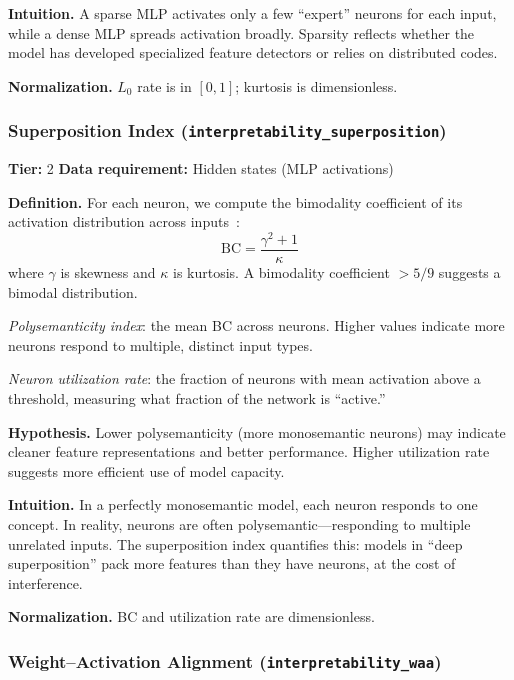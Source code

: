 \documentclass{article}
\begin{document}
\textbf{Intuition.}
A sparse MLP activates only a few ``expert'' neurons for each input, while a dense MLP spreads activation broadly. Sparsity reflects whether the model has developed specialized feature detectors or relies on distributed codes.

\textbf{Normalization.} $L_0$ rate is in $[0, 1]$; kurtosis is dimensionless.

\subsubsection{Superposition Index (\texttt{interpretability\_superposition})}
\label{app:superposition}

\textbf{Tier:} 2 \quad \textbf{Data requirement:} Hidden states (MLP activations)

\textbf{Definition.}
For each neuron, we compute the bimodality coefficient of its activation distribution across inputs~\citep{templeton2024scaling}:
\begin{equation}
  \text{BC} = \frac{\gamma^2 + 1}{\kappa}
\end{equation}
where $\gamma$ is skewness and $\kappa$ is kurtosis. A bimodality coefficient $> 5/9$ suggests a bimodal distribution.

\emph{Polysemanticity index}: the mean BC across neurons. Higher values indicate more neurons respond to multiple, distinct input types.

\emph{Neuron utilization rate}: the fraction of neurons with mean activation above a threshold, measuring what fraction of the network is ``active.''

\textbf{Hypothesis.}
Lower polysemanticity (more monosemantic neurons) may indicate cleaner feature representations and better performance. Higher utilization rate suggests more efficient use of model capacity.

\textbf{Intuition.}
In a perfectly monosemantic model, each neuron responds to one concept. In reality, neurons are often polysemantic---responding to multiple unrelated inputs. The superposition index quantifies this: models in ``deep superposition'' pack more features than they have neurons, at the cost of interference.

\textbf{Normalization.} BC and utilization rate are dimensionless.

\subsubsection{Weight--Activation Alignment (\texttt{interpretability\_waa})}
\label{app:waa}
\end{document}
